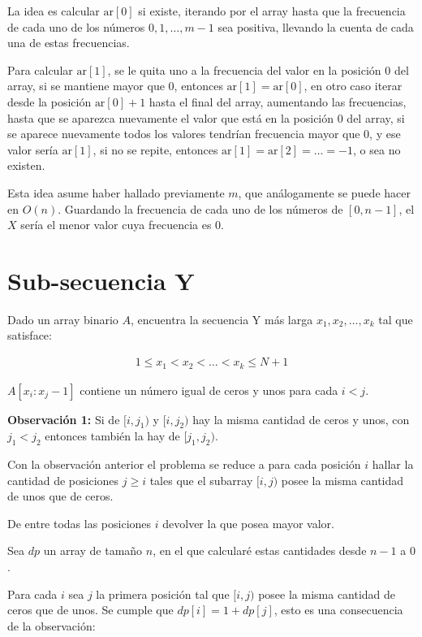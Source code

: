 \documentclass[14pt]{extarticle}
\begin{document}
La idea es calcular $\text{ar}[0]$ si existe, iterando por el array hasta que la frecuencia de cada uno de los números $0, 1, \ldots, m-1$ sea positiva, llevando la cuenta de cada una de estas frecuencias.

Para calcular $\text{ar}[1]$, se le quita uno a la frecuencia del valor en la posición $0$ del array, si se mantiene mayor que $0$, entonces $\text{ar}[1] = \text{ar}[0]$, en otro caso iterar desde la posición $\text{ar}[0] + 1$ hasta el final del array, aumentando las frecuencias, hasta que se aparezca nuevamente el valor que está en la posición $0$ del array, si se aparece nuevamente todos los valores tendrían frecuencia mayor que $0$, y ese valor sería $\text{ar}[1]$, si no se repite, entonces $\text{ar}[1] = \text{ar}[2] = \ldots = -1$, o sea no existen.

Esta idea asume haber hallado previamente $m$, que análogamente se puede hacer en $O(n)$. Guardando la frecuencia de cada uno de los números de $[0, n-1]$, el $X$ sería el menor valor cuya frecuencia es $0$.

\section*{ Sub-secuencia Y}

Dado un array binario $A$, encuentra la secuencia Y más larga $x_1, x_2, \dots, x_k$ tal que satisface:

\begin{align}
1 \leq x_1 < x_2 < \dots < x_k \leq N + 1
\end{align}

$A[x_i : x_j - 1]$ contiene un número igual de ceros y unos para cada $i < j$.

\textbf{Observación 1:} Si de $[i, j_1)$ y $[i, j_2)$ hay la misma cantidad de ceros y unos, con $j_1 < j_2$ entonces también la hay de $[j_1, j_2)$.

Con la observación anterior el problema se reduce a para cada posición $i$ hallar la cantidad de posiciones $j \geq i$ tales que el subarray $[i, j)$ posee la misma cantidad de unos que de ceros.

De entre todas las posiciones $i$ devolver la que posea mayor valor.

Sea $dp$ un array de tamaño $n$, en el que calcularé estas cantidades desde $n-1$ a $0$.

Para cada $i$ sea $j$ la primera posición tal que $[i, j)$ posee la misma cantidad de ceros que de unos. Se cumple que $dp[i] = 1 + dp[j]$, esto es una consecuencia de la observación:
\end{document}
